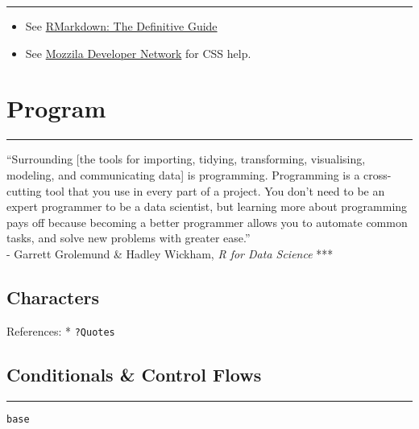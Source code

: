 \documentclass[
]{book}
\providecommand{\tightlist}{%
  \setlength{\itemsep}{0pt}\setlength{\parskip}{0pt}}
\begin{document}
\begin{center}\rule{0.5\linewidth}{0.5pt}\end{center}

\begin{itemize}
\tightlist
\item
  See \href{https://bookdown.org/yihui/rmarkdown/}{RMarkdown: The Definitive Guide}
\item
  See \href{https://developer.mozilla.org/en-US/docs/Web/CSS/CSS_Selectors}{Mozzila Developer Network} for CSS help.
\end{itemize}

\hypertarget{program}{%
\chapter{Program}\label{program}}

\begin{center}\rule{0.5\linewidth}{0.5pt}\end{center}

``Surrounding {[}the tools for importing, tidying, transforming, visualising, modeling, and communicating data{]} is programming. Programming is a cross-cutting tool that you use in every part of a project. You don't need to be an expert programmer to be a data scientist, but learning more about programming pays off because becoming a better programmer allows you to automate common tasks, and solve new problems with greater ease.''\\
- Garrett Grolemund \& Hadley Wickham, \emph{R for Data Science}
***

\hypertarget{characters}{%
\section{Characters}\label{characters}}

References:
* \texttt{?Quotes}

\hypertarget{conditionals-control-flows}{%
\section{Conditionals \& Control Flows}\label{conditionals-control-flows}}

\begin{center}\rule{0.5\linewidth}{0.5pt}\end{center}

\texttt{base}
\end{document}
